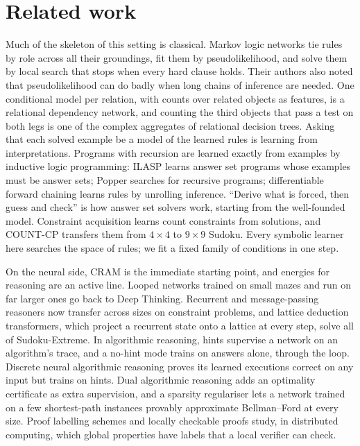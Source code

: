 \section{Related work}\label{sec:related}

Much of the skeleton of this setting is classical. Markov logic networks tie rules by role across all their groundings, fit them by pseudolikelihood, and solve them by
local search that stops when every hard clause holds\cite{richardson2006markov}. Their authors also noted that pseudolikelihood can do badly when long chains of
inference are needed\cite{lowd2007efficient}. One conditional model per relation, with counts over related objects as
features, is a relational dependency network\cite{neville2007relational}, and counting the third objects that pass a test
on both legs is one of the complex aggregates of relational decision trees\cite{vens2006refining}. Asking that each
solved example be a model of the learned rules is learning from interpretations\cite{deraedt1994first}. Programs with
recursion are learned exactly from examples by inductive logic programming: ILASP learns answer set programs whose
examples must be answer sets\cite{law2014inductive}; Popper searches for recursive programs\cite{cropper2021learning};
differentiable forward chaining learns rules by unrolling inference\cite{evans2018learning}. ``Derive what is forced,
then guess and check'' is how answer set solvers work, starting from the well-founded model\cite{vangelder1991well}.
Constraint acquisition learns count constraints from solutions, and COUNT-CP transfers them from $4\times4$ to $9\times9$
Sudoku\cite{kumar2022learning}. Every symbolic learner here searches the space of rules; we fit a fixed family of
conditions in one step.

On the neural side, CRAM is the immediate starting point\cite{hoover2026classical}, and energies for reasoning are an
active line\cite{du2022learning,chen2026energy}. Looped networks trained on small mazes and run on far larger ones go
back to Deep Thinking\cite{bansal2022end}. Recurrent and message-passing reasoners now transfer across sizes on
constraint problems\cite{toenshoff2023one,salvatori2026tiny}, and lattice deduction transformers, which project a
recurrent state onto a lattice at every step, solve all of Sudoku-Extreme\cite{davis2026lattice}. In algorithmic reasoning, hints supervise a network
on an algorithm's trace\cite{velickovic2022clrs}, and a no-hint mode trains on answers alone, through the
loop\cite{rodionov2023neural}. Discrete neural algorithmic reasoning proves its learned executions correct on any input
but trains on hints\cite{rodionov2025discrete}. Dual algorithmic reasoning adds an optimality certificate as extra
supervision\cite{numeroso2023dual}, and a sparsity regulariser lets a network trained on a few shortest-path instances
provably approximate Bellman--Ford at every size\cite{nerem2025graph}. Proof labelling schemes and locally checkable
proofs study, in distributed computing, which global properties have labels that a local verifier can
check\cite{korman2010proof,korman2007distributed,goos2016locally}.

